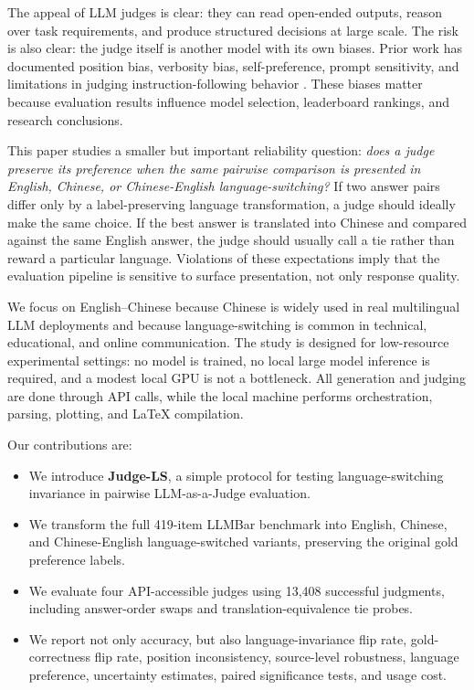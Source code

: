 \documentclass[10pt,twocolumn]{article}
\begin{document}
The appeal of LLM judges is clear: they can read open-ended outputs, reason over task requirements, and produce structured decisions at large scale. The risk is also clear: the judge itself is another model with its own biases. Prior work has documented position bias, verbosity bias, self-preference, prompt sensitivity, and limitations in judging instruction-following behavior \cite{liu2023geval,zeng2024llmbar,zheng2023judging,dubois2024lengthcontrolled,wang2024fair,panickssery2024selfpreference}. These biases matter because evaluation results influence model selection, leaderboard rankings, and research conclusions.

This paper studies a smaller but important reliability question: \emph{does a judge preserve its preference when the same pairwise comparison is presented in English, Chinese, or Chinese-English language-switching?} If two answer pairs differ only by a label-preserving language transformation, a judge should ideally make the same choice. If the best answer is translated into Chinese and compared against the same English answer, the judge should usually call a tie rather than reward a particular language. Violations of these expectations imply that the evaluation pipeline is sensitive to surface presentation, not only response quality.

We focus on English--Chinese because Chinese is widely used in real multilingual LLM deployments and because language-switching is common in technical, educational, and online communication. The study is designed for low-resource experimental settings: no model is trained, no local large model inference is required, and a modest local GPU is not a bottleneck. All generation and judging are done through API calls, while the local machine performs orchestration, parsing, plotting, and LaTeX compilation.

Our contributions are:
\begin{itemize}
    \item We introduce \textbf{Judge-LS}, a simple protocol for testing language-switching invariance in pairwise LLM-as-a-Judge evaluation.
    \item We transform the full 419-item LLMBar benchmark into English, Chinese, and Chinese-English language-switched variants, preserving the original gold preference labels.
    \item We evaluate four API-accessible judges using 13,408 successful judgments, including answer-order swaps and translation-equivalence tie probes.
    \item We report not only accuracy, but also language-invariance flip rate, gold-correctness flip rate, position inconsistency, source-level robustness, language preference, uncertainty estimates, paired significance tests, and usage cost.
\end{itemize}
\end{document}
